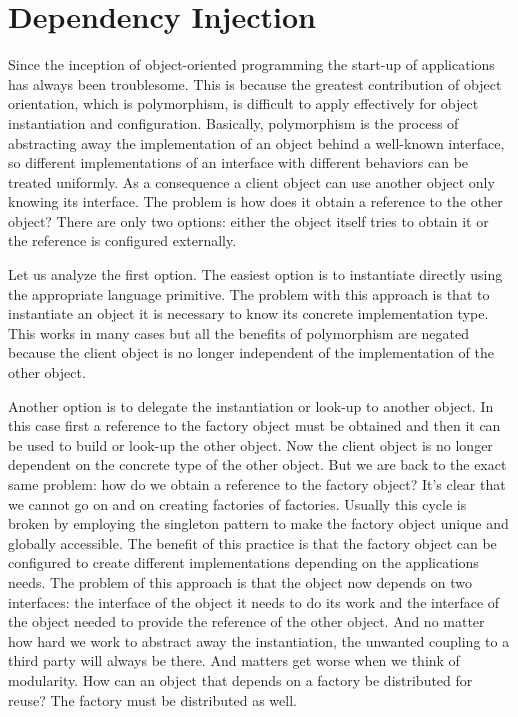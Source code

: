 \chapter{Dependency Injection}


Since the inception of object-oriented programming the start-up of applications has always been troublesome.
This is because the greatest contribution of object orientation, which is polymorphism, is difficult to
apply effectively for object instantiation and configuration. Basically, polymorphism is the process of 
abstracting away the implementation of an object behind a well-known interface, so different
implementations of an interface with different behaviors can be treated uniformly. As a consequence a client
object can use another object only knowing its interface. The problem is how does it obtain a reference to
the other object? There are only two options: either the object itself tries to obtain it or the reference is configured externally. 

Let us analyze the first option. The easiest option is to instantiate directly using the appropriate language primitive.
The problem with this approach is that to instantiate an object it is necessary to know its concrete implementation type.
This works in many cases but all the benefits of polymorphism are negated because the client object is no longer
independent of the implementation of the other object. 

Another option is to delegate the instantiation or look-up to another object. In this case first a reference to the factory object
must be obtained and then it can be used to build or look-up the other object. Now the client object is no longer dependent on the
concrete type of the other object. But we are back to the exact same problem: how do we obtain a reference to the factory object?
It's clear that we cannot go on and on creating factories of factories. Usually this cycle is broken by employing the singleton pattern
to make the factory object unique and globally accessible. The benefit of this practice is that the factory object can be configured
to create different implementations depending on the applications needs. The problem of this approach is that the object now depends
on two interfaces: the interface of the object it needs to do its work and the interface of the object needed to provide the reference
of the other object. And no matter how hard we work to abstract away the instantiation, the unwanted coupling to a third party will always
be there. And matters get worse when we think of modularity. How can an object that depends on a factory be distributed for reuse?
The factory must be distributed as well.

